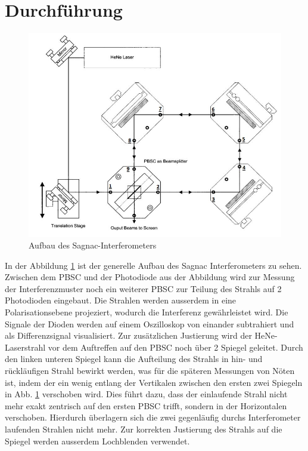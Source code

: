 	\section{Durchführung}
  \begin{figure}[H]
    \center
    \includegraphics[width=\textwidth]{./plots/Versuchsaufbau.JPG}
    \caption{Aufbau des Sagnac-Interferometers\cite{Anleitung}}
		\label{aufbau}
	\end{figure}
 In der Abbildung \ref{aufbau} ist der generelle Aufbau des Sagnac Interferometers zu sehen. Zwischen dem PBSC und der Photodiode aus der Abbildung wird
  zur Messung der Interferenzmuster noch ein weiterer PBSC zur Teilung des Strahls auf 2 Photodioden eingebaut. Die Strahlen werden ausserdem in eine Polarisationsebene projeziert, wodurch die Interferenz gewährleistet wird.
	Die Signale der Dioden werden auf einem Oszilloskop von einander subtrahiert und als Differenzsignal visualisiert.
  Zur zusätzlichen Justierung wird der HeNe-Laserstrahl vor dem Auftreffen auf den PBSC noch über 2 Spiegel geleitet. Durch den linken unteren Spiegel kann die Aufteilung des Strahls in hin- und rückläufigen
  Strahl bewirkt werden, was für die späteren Messungen von Nöten ist, indem der ein wenig entlang der Vertikalen zwischen den ersten zwei Spiegeln
	in Abb. \ref{aufbau} verschoben wird. Dies führt dazu, dass der einlaufende Strahl nicht mehr exakt zentrisch auf den ersten PBSC trifft, sondern in der Horizontalen verschoben. Hierdurch überlagern sich die zwei gegenläufig durchs Interferometer laufenden Strahlen nicht mehr. Zur korrekten Justierung des Strahls auf die Spiegel werden ausserdem Lochblenden verwendet.\\
